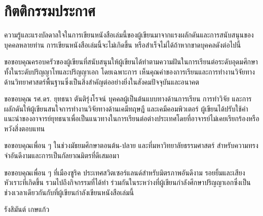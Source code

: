 

\chapter*{\centering กิตติกรรมประกาศ}

ความรู้และแรงบัลดาลใจในการเขียนหนังสือเล่มนี้ของผู้เขียนมาจากแรงผลักดันและการสนับสนุนของบุคคลหลายท่าน การเขียนหนังสือเล่มนี้จะไม่เกิดขึ้น%
หรือสำเร็จไม่ได้ถ้าหากขาดบุคคลดังต่อไปนี้

ขอขอบคุณครอบครัวของผู้เขียนที่สนับสนุนให้ผู้เขียนได้ทำตามความฝันในการเรียนต่อระดับอุดมศึกษา ทั้งในระดับปริญญาโทและปริญญาเอก โดยเฉพาะการ%
เห็นคุณค่าของการเรียนและการทำงานวิจัยทางด้านวิทยาศาสตร์พื้นฐานซึ่งเป็นสิ่งสำคัญต่ออย่างยิ่งในสังคมปัจจุบันและอนาคต

ขอขอบคุณ รศ.ดร. ยุทธนา ตันติรุ่งโรจน์ บุคคลผู้เป็นต้นแบบทางด้านการเรียน การทำวิจัย และการผลักดันให้ผู้เขียนสนใจการทำงานวิจัยทางด้านเคมีทฤษฎี%
และเคมีคอมพิวเตอร์ ผู้เขียนได้ปรับใช้คำแนะนำของอาจารย์ยุทธนาเพื่อเป็นแนวทางในการเรียนต่อต่างประเทศโดยที่อาจารย์ไม่เคยเรียกร้องหรือหวังสิ่งตอบแทน

ขอขอบคุณเพื่อน ๆ ในช่วงมัธยมศึกษาตอนต้น-ปลาย และที่มหาวิทยาลัยธรรมศาสตร์ สำหรับความทรงจำอันดีงามและการเป็นกัลยาณมิตรที่ดีเสมอมา

ขอขอบคุณเพื่อน ๆ ที่เมืองซูริค ประเทศสวิตเซอร์แลนด์สำหรับมิตรภาพอันดีงาม รอยยิ้มและเสียงหัวเราะที่เกิดขึ้น รวมไปถึงกิจกรรมที่ได้ทำ%
ร่วมกันในระหว่างที่ผู้เขียนกำลังศึกษาปริญญาเอกซึ่งเป็นช่วงเวลาเดียวกันกับที่ผู้เขียนกำลังเขียนหนังสือเล่มนี้

\medskip

\begin{flushright}
รังสิมันต์ เกษแก้ว
\end{flushright}
